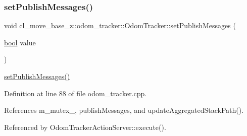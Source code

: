 \subsubsection{\texorpdfstring{set\+Publish\+Messages()}{setPublishMessages()}}
{\footnotesize\ttfamily void cl\+\_\+move\+\_\+base\+\_\+z\+::odom\+\_\+tracker\+::\+Odom\+Tracker\+::set\+Publish\+Messages (\begin{DoxyParamCaption}\item[{\hyperlink{classbool}{bool}}]{value }\end{DoxyParamCaption})}

\hyperlink{classcl__move__base__z_1_1odom__tracker_1_1OdomTracker_a3b3cf9010e4e4fe4f96cfafd5a529517}{set\+Publish\+Messages()} 

Definition at line 88 of file odom\+\_\+tracker.\+cpp.



References m\+\_\+mutex\+\_\+, publish\+Messages, and update\+Aggregated\+Stack\+Path().



Referenced by Odom\+Tracker\+Action\+Server\+::execute().


